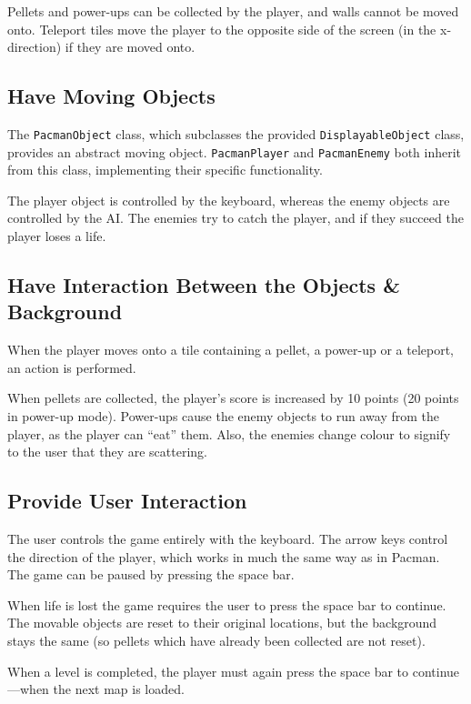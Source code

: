 \documentclass[a4paper,11pt]{article}
\begin{document}
    Pellets and power-ups can be collected by the player, and walls cannot be
    moved onto. Teleport tiles move the player to the opposite side of the
    screen (in the x-direction) if they are moved onto.

    \subsection{Have Moving Objects}

    The \verb!PacmanObject! class, which subclasses the provided
    \verb!DisplayableObject! class, provides an abstract moving object.
    \verb!PacmanPlayer! and \verb!PacmanEnemy! both inherit from this class,
    implementing their specific functionality.

    The player object is controlled by the keyboard, whereas the enemy objects
    are controlled by the AI. The enemies try to catch the player, and if they
    succeed the player loses a life.

    \subsection{Have Interaction Between the Objects \& Background}

    When the player moves onto a tile containing a pellet, a power-up or
    a teleport, an action is performed.

    When pellets are collected, the player's score is increased by 10 points
    (20 points in power-up mode). Power-ups cause the enemy objects to run away
    from the player, as the player can ``eat'' them. Also, the enemies change
    colour to signify to the user that they are scattering.

    \subsection{Provide User Interaction}

    The user controls the game entirely with the keyboard. The arrow keys
    control the direction of the player, which works in much the same way as
    in Pacman. The game can be paused by pressing the space bar.

    When life is lost the game requires the user to press the space bar to
    continue. The movable objects are reset to their original locations, but
    the background stays the same (so pellets which have already been collected
    are not reset).

    When a level is completed, the player must again press the space bar to
    continue---when the next map is loaded.
\end{document}
